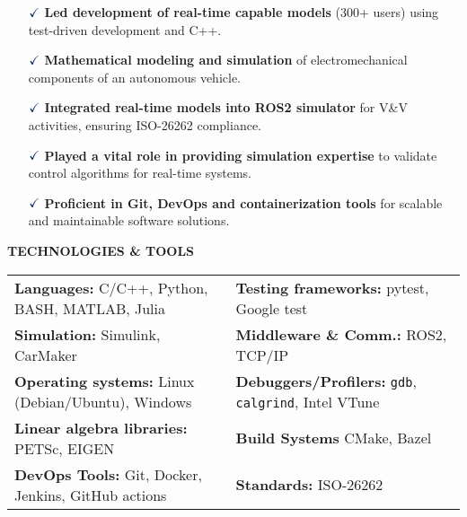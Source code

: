 \documentclass[a4paper,10pt]{article}
\begin{document}
\vspace{0.1cm}
\begin{itemize}
    \item[$\textcolor{highlightcolor}{\checkmark}$] \textcolor{highlightcolor}{\textbf{Led development of real-time capable models}} (300+ users) using test-driven development and C++.
    \item[$\textcolor{highlightcolor}{\checkmark}$] \textcolor{highlightcolor}{\textbf{Mathematical modeling and simulation}} of electromechanical components of an autonomous vehicle.
    \item[$\textcolor{highlightcolor}{\checkmark}$] \textcolor{highlightcolor}{\textbf{Integrated real-time models into ROS2 simulator}} for V\&V activities, ensuring ISO-26262 compliance.
    \item[$\textcolor{highlightcolor}{\checkmark}$] \textcolor{highlightcolor}{\textbf{Played a vital role in providing simulation expertise}} to validate control algorithms for real-time systems.
    \item[$\textcolor{highlightcolor}{\checkmark}$] \textcolor{highlightcolor}{\textbf{Proficient in Git, DevOps and containerization tools}} for scalable and maintainable software solutions.
\end{itemize}

\noindent{\rule{\linewidth}{1.4pt}}
\textbf{TECHNOLOGIES \& TOOLS}

\vspace{-0.1cm}
\noindent{\rule{\linewidth}{0.01cm}}

\vspace{-0.4cm}
\noindent
\begin{center}
    \begin{tabular}{ @{\hskip 0pt}m{} m{} }
        \textcolor{highlightcolor}{\textbf{Languages:}} C/C++, Python, BASH, MATLAB, Julia & \textcolor{highlightcolor}{\textbf{Testing frameworks:}} pytest, Google test \\ 
        \textcolor{highlightcolor}{\textbf{Simulation:}} Simulink, CarMaker & \textcolor{highlightcolor}{\textbf{Middleware \& Comm.:}} ROS2, TCP/IP \\
        \textcolor{highlightcolor}{\textbf{Operating systems:}} Linux (Debian/Ubuntu), Windows & \textcolor{highlightcolor}{\textbf{Debuggers/Profilers:}} \verb|gdb|, \verb|calgrind|, Intel VTune \\
        \textcolor{highlightcolor}{\textbf{Linear algebra libraries:}} PETSc, EIGEN & \textcolor{highlightcolor}{\textbf{Build Systems}} CMake, Bazel\\
        \textcolor{highlightcolor}{\textbf{DevOps Tools:}} Git, Docker, Jenkins, GitHub actions & \textcolor{highlightcolor}{\textbf{Standards:}} ISO-26262 \\
    \end{tabular}
\end{center}
\end{document}
